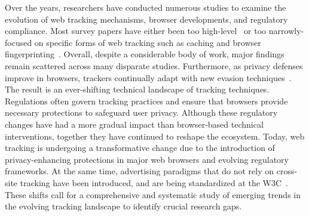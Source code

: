 Over the years, researchers have conducted numerous studies to examine the evolution of web tracking mechanisms, browser developments, and regulatory compliance. 
%
Most survey papers have either been too high-level~\cite{ermakova2018web} or too narrowly-focused on specific forms of web tracking such as caching and browser fingerprinting~\cite{bujlowSurveyWebTracking2017, laperdrix2020browser}. 
%
Overall, despite a considerable body of work, major findings remain scattered across many disparate studies.
Furthermore, as privacy defenses improve in browsers, trackers continually adapt with new evasion techniques~\cite{narayanan2018web, localmess-usenix-sec-26}.
%
The result is an ever-shifting technical landscape of tracking techniques.
%
Regulations often govern tracking practices and ensure that browsers provide necessary protections to safeguard user privacy.
%
Although these regulatory changes have had a more gradual impact than browser-based technical interventions, together they have continued to reshape the ecosystem. 
%
Today, web tracking is undergoing a transformative change due to the introduction of privacy-enhancing protections in major web browsers and evolving regulatory frameworks.
%
At the same time, advertising paradigms that do not rely on cross-site tracking have been introduced, and are being standardized at the W3C~\cite{chavezUpdatePlansPrivacy2025, hercherW3CAdPrivacy2022}.
%
These shifts call for a comprehensive and systematic study of emerging trends in the evolving tracking landscape to identify crucial research gaps.
%

